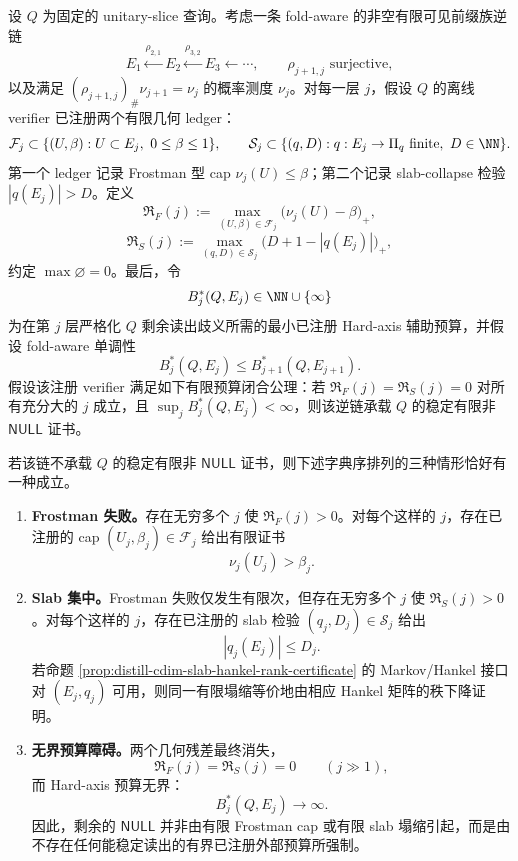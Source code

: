 \begin{theorem}[可见前缀坏例的条件性穷竭三分律]\label{distill:euclid_elements-exhaustion_and_finite_budget_closure_families-cdim-visible-prefix-residual-trichotomy}
设 \(Q\) 为固定的 unitary-slice 查询。考虑一条 fold-aware 的非空有限可见前缀族逆链
\[
E_1\xleftarrow{\rho_{2,1}}E_2\xleftarrow{\rho_{3,2}}E_3\xleftarrow{}\cdots,
\qquad
\rho_{j+1,j}\text{ surjective},
\]
以及满足 \((\rho_{j+1,j})_\#\nu_{j+1}=\nu_j\) 的概率测度 \(\nu_j\)。对每一层 \(j\)，假设 \(Q\) 的离线 verifier 已注册两个有限几何 ledger：
\[
\mathcal F_j\subset\{(U,\beta):U\subset E_j,\ 0\le\beta\le1\},
\qquad
\mathcal S_j\subset\{(q,D):q:E_j\to\Pi_q\text{ finite},\ D\in\NN\}.
\]
第一个 ledger 记录 Frostman 型 cap \(\nu_j(U)\le\beta\)；第二个记录 slab-collapse 检验 \(|q(E_j)|>D\)。定义
\[
\mathfrak R_F(j):=\max_{(U,\beta)\in\mathcal F_j}\bigl(\nu_j(U)-\beta\bigr)_+,
\]
\[
\mathfrak R_S(j):=\max_{(q,D)\in\mathcal S_j}\bigl(D+1-|q(E_j)|\bigr)_+,
\]
约定 \(\max\varnothing=0\)。最后，令
\[
B_j^\ast(Q,E_j)\in\NN\cup\{\infty\}
\]
为在第 \(j\) 层严格化 \(Q\) 剩余读出歧义所需的最小已注册 Hard-axis 辅助预算，并假设 fold-aware 单调性
\[
B_j^\ast(Q,E_j)\le B_{j+1}^\ast(Q,E_{j+1}).
\]
假设该注册 verifier 满足如下有限预算闭合公理：若 \(\mathfrak R_F(j)=\mathfrak R_S(j)=0\) 对所有充分大的 \(j\) 成立，且 \(\sup_j B_j^\ast(Q,E_j)<\infty\)，则该逆链承载 \(Q\) 的稳定有限非 \(\mathsf{NULL}\) 证书。

若该链不承载 \(Q\) 的稳定有限非 \(\mathsf{NULL}\) 证书，则下述字典序排列的三种情形恰好有一种成立。
\begin{enumerate}
  \item \textbf{Frostman 失败。}存在无穷多个 \(j\) 使 \(\mathfrak R_F(j)>0\)。对每个这样的 \(j\)，存在已注册的 cap \((U_j,\beta_j)\in\mathcal F_j\) 给出有限证书
  \[
  \nu_j(U_j)>\beta_j.
  \]
  \item \textbf{Slab 集中。}Frostman 失败仅发生有限次，但存在无穷多个 \(j\) 使 \(\mathfrak R_S(j)>0\)。对每个这样的 \(j\)，存在已注册的 slab 检验 \((q_j,D_j)\in\mathcal S_j\) 给出
  \[
  |q_j(E_j)|\le D_j.
  \]
  若命题 \ref{prop:distill-cdim-slab-hankel-rank-certificate} 的 Markov/Hankel 接口对 \((E_j,q_j)\) 可用，则同一有限塌缩等价地由相应 Hankel 矩阵的秩下降证明。
  \item \textbf{无界预算障碍。}两个几何残差最终消失，
  \[
  \mathfrak R_F(j)=\mathfrak R_S(j)=0\qquad(j\gg1),
  \]
  而 Hard-axis 预算无界：
  \[
  B_j^\ast(Q,E_j)\longrightarrow\infty.
  \]
  因此，剩余的 \(\mathsf{NULL}\) 并非由有限 Frostman cap 或有限 slab 塌缩引起，而是由不存在任何能稳定读出的有界已注册外部预算所强制。
\end{enumerate}
\end{theorem}
